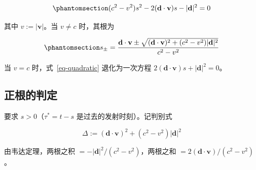 \documentclass[
  chinese,
  a4paper,
  UTF8,
  12pt,
  oneside,
  openany]{ctexbook}
\theoremstyle{plain}
\theoremstyle{plain}
\theoremstyle{plain}
\theoremstyle{definition}
\theoremstyle{plain}
\theoremstyle{plain}
\theoremstyle{remark}
\begin{document}
\begin{equation}\protect\phantomsection\label{eq-quadratic}{
(c^{2}-v^{2})s^{2}-2(\mathbf{d}\cdot\mathbf{v})s-|\mathbf{d}|^{2}=0
}\end{equation}

其中 \(v:=|\mathbf{v}|\)。当 \(v\neq c\) 时，其根为

\begin{equation}\protect\phantomsection\label{eq-roots}{
s_{\pm}=\frac{\mathbf{d}\cdot\mathbf{v}\pm\sqrt{(\mathbf{d}\cdot\mathbf{v})^{2}+(c^{2}-v^{2})|\mathbf{d}|^{2}}}{c^{2}-v^{2}}
}\end{equation}

当 \(v=c\) 时，式~\ref{eq-quadratic} 退化为一次方程
\(2(\mathbf{d}\cdot\mathbf{v})s+|\mathbf{d}|^{2}=0\)。

\subsection{正根的判定}\label{ux6b63ux6839ux7684ux5224ux5b9a}

要求 \(s>0\)（\(\tau^{*}=t-s\) 是过去的发射时刻）。记判别式

\[
\Delta:=(\mathbf{d}\cdot\mathbf{v})^{2}+(c^{2}-v^{2})|\mathbf{d}|^{2}
\]

由韦达定理，两根之积 \(=-|\mathbf{d}|^{2}/(c^{2}-v^{2})\)，两根之和
\(=2(\mathbf{d}\cdot\mathbf{v})/(c^{2}-v^{2})\)。
\end{document}
